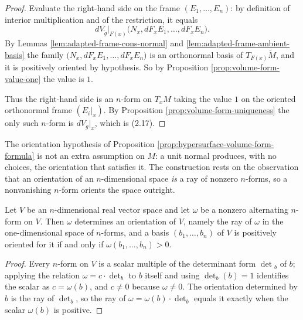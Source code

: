 \begin{proof}
\leanok
{}
Evaluate the right-hand side on the frame $(E_1, \ldots, E_n)$: by definition of interior
multiplication and of the restriction, it equals
\[
  dV_{\tilde g}|_{F(x)}\bigl(N_x, dF_x E_1, \ldots, dF_x E_n\bigr).
\]
By Lemmas \ref{lem:adapted-frame-cons-normal} and \ref{lem:adapted-frame-ambient-basis} the
family $\bigl(N_x, dF_x E_1, \ldots, dF_x E_n\bigr)$ is an orthonormal basis of
$T_{F(x)}\tilde M$, and it is positively oriented by hypothesis. So by Proposition
\ref{prop:volume-form-value-one} the value is $1$.

Thus the right-hand side is an $n$-form on $T_x M$ taking the value $1$ on the oriented
orthonormal frame $(E_i|_x)$. By Proposition \ref{prop:volume-form-uniqueness} the only such
$n$-form is $dV_g|_x$, which is (2.17).
\end{proof}

The orientation hypothesis of Proposition \ref{prop:hypersurface-volume-form-formula} is not an
extra assumption on $M$: a unit normal produces, with no choices, the orientation that satisfies
it. The construction rests on the observation that an orientation of an $n$-dimensional space
\emph{is} a ray of nonzero $n$-forms, so a nonvanishing $n$-form orients the space outright.

\begin{lemma}
\label{lem:nonvanishing-top-form-orientation}
\leanok
Let $V$ be an $n$-dimensional real vector space and let $\omega$ be a nonzero alternating
$n$-form on $V$. Then $\omega$ determines an orientation of $V$, namely the ray of $\omega$ in
the one-dimensional space of $n$-forms, and a basis $(b_1, \ldots, b_n)$ of $V$ is positively
oriented for it if and only if $\omega(b_1, \ldots, b_n) > 0$.
\end{lemma}

\begin{proof}
\leanok
Every $n$-form on $V$ is a scalar multiple of the determinant form $\det{}_b$ of $b$; applying
the relation $\omega = c \cdot \det_b$ to $b$ itself and using $\det_b(b) = 1$ identifies the
scalar as $c = \omega(b)$, and $c \ne 0$ because $\omega \ne 0$. The orientation determined by
$b$ is the ray of $\det_b$, so the ray of $\omega = \omega(b) \cdot \det_b$ equals it exactly
when the scalar $\omega(b)$ is positive.
\end{proof}

